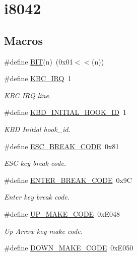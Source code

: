 \hypertarget{group__i8042}{}\section{i8042}
\label{group__i8042}
\subsection*{Macros}
\begin{DoxyCompactItemize}
\item 
\#define \hyperlink{group__i8042_ga3a8ea58898cb58fc96013383d39f482c}{B\+IT}(n)~(0x01$<$$<$(n))
\item 
\#define \hyperlink{group__i8042_ga16c5827f043d82f87c726c2d4369c11d}{K\+B\+C\+\_\+\+I\+RQ}~1
\begin{DoxyCompactList}\small\item\em K\+BC I\+RQ line. \end{DoxyCompactList}\item 
\#define \hyperlink{group__i8042_gaa81852ab329dba0e94b98ebcd83fc6f2}{K\+B\+D\+\_\+\+I\+N\+I\+T\+I\+A\+L\+\_\+\+H\+O\+O\+K\+\_\+\+ID}~1
\begin{DoxyCompactList}\small\item\em K\+BD Initial hook\+\_\+id. \end{DoxyCompactList}\item 
\#define \hyperlink{group__i8042_ga592dfdf397b21913348b4dd6b7759b2d}{E\+S\+C\+\_\+\+B\+R\+E\+A\+K\+\_\+\+C\+O\+DE}~0x81
\begin{DoxyCompactList}\small\item\em E\+SC key break code. \end{DoxyCompactList}\item 
\#define \hyperlink{group__i8042_ga54db80d887c9139084b1a66243fa3f72}{E\+N\+T\+E\+R\+\_\+\+B\+R\+E\+A\+K\+\_\+\+C\+O\+DE}~0x9C
\begin{DoxyCompactList}\small\item\em Enter key break code. \end{DoxyCompactList}\item 
\#define \hyperlink{group__i8042_gabfc37fa43c153f929cf0c3421979bfc5}{U\+P\+\_\+\+M\+A\+K\+E\+\_\+\+C\+O\+DE}~0x\+E048
\begin{DoxyCompactList}\small\item\em Up Arrow key make code. \end{DoxyCompactList}\item 
\#define \hyperlink{group__i8042_ga88ccb7cfaafc37d4f31f61191018b4ff}{D\+O\+W\+N\+\_\+\+M\+A\+K\+E\+\_\+\+C\+O\+DE}~0x\+E050
$$
\end{DoxyCompactItemize}
